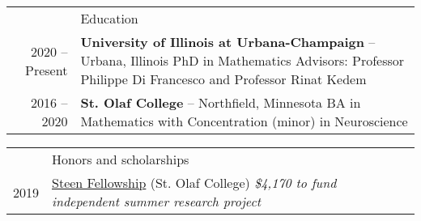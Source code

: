 \documentclass[letterpaper, 11pt]{article}
\newcommand{\headingfont}{\Large\color{Red}}
\newenvironment{SectionTable}[1]{
	\renewcommand*{\arraystretch}{1.7}
	\setlength{\tabcolsep}{10pt}
	\begin{longtable}{Rp{5.2in}} & #1 \\}
	{\end{longtable}\vspace{-.3cm}}
\newenvironment{SectionTableSingleSpace}[1]{
	\renewcommand*{\arraystretch}{1.2}
	\setlength{\tabcolsep}{10pt}
	\begin{longtable}{Rp{5.2in}} & #1 \\[0.6em]}
	{\end{longtable}\vspace{-.3cm}}
\begin{document}
	\begin{SectionTable}{\headingfont Education}
		2020 -- Present & 
		\textbf{University of Illinois at Urbana-Champaign} -- Urbana, Illinois \newline
		PhD in Mathematics \newline 
		Advisors: Professor Philippe Di Francesco and Professor Rinat Kedem %
		\\
		
		2016 -- 2020 & 
		\textbf{St. Olaf College} -- Northfield, Minnesota \newline
		BA in Mathematics with Concentration (minor) in Neuroscience \newline 
		\\
		
		
		
		
	\end{SectionTable}
	
	
	\begin{SectionTableSingleSpace}{\headingfont Honors and scholarships}

		
		2019 &
		\href{https://wp.stolaf.edu/curi/summer-undergraduate-research}{Steen Fellowship} (St. Olaf College) \newline 
		\textit{\$4,170  to fund independent summer research project}
		\\
		
		
	\end{SectionTableSingleSpace}
	
	
\end{document}
